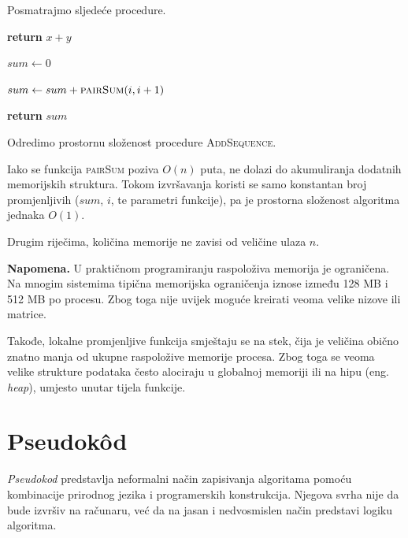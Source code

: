 \begin{example}
	Posmatrajmo sljedeće procedure.
	
	\begin{algorithm}[H]
		\begin{algorithmic}[1]
			\State \textbf{return} $x+y$
			\EndProcedure
		\end{algorithmic}
	\end{algorithm}
	
	\begin{algorithm}[H]
		\begin{algorithmic}[1]
			\State $sum \gets 0$
			
			\State $sum \gets sum + \textsc{pairSum}(i,i+1)$
			\EndFor
			
			\State \textbf{return} $sum$
			\EndProcedure
		\end{algorithmic}
	\end{algorithm}
	
	Odredimo prostornu složenost procedure \textsc{AddSequence}.
	
	Iako se funkcija \textsc{pairSum} poziva $O(n)$ puta, ne dolazi do akumuliranja dodatnih memorijskih struktura. Tokom izvršavanja koristi se samo konstantan broj promjenljivih ($sum$, $i$, te parametri funkcije), pa je prostorna složenost algoritma jednaka	$
	O(1).
	$
	
	Drugim riječima, količina memorije ne zavisi od veličine ulaza $n$.
\end{example}

\textbf{Napomena.} 
U praktičnom programiranju raspoloživa memorija je ograničena. Na mnogim sistemima tipična memorijska ograničenja iznose između 128 MB i 512 MB po procesu. Zbog toga nije uvijek moguće kreirati veoma velike nizove ili matrice.

Takođe, lokalne promjenljive funkcija smještaju se na stek, čija je veličina obično znatno manja od ukupne raspoložive memorije procesa. Zbog toga se veoma velike strukture podataka često alociraju u globalnoj memoriji ili na hipu (eng. \emph{heap}), umjesto unutar tijela funkcije.

\section{Pseudok\^od}

\textit{Pseudokod} predstavlja neformalni način zapisivanja algoritama pomoću kombinacije prirodnog jezika i programerskih konstrukcija. Njegova svrha nije da bude izvršiv na računaru, već da na jasan i nedvosmislen način predstavi logiku algoritma.


